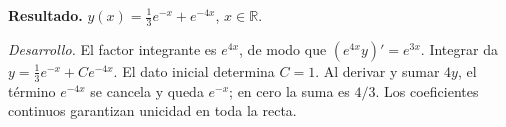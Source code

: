 \noindent\textbf{Resultado.} $y(x)=\tfrac13e^{-x}+e^{-4x}$, $x\in\mathbb R$.

\noindent\textit{Desarrollo.} El factor integrante es $e^{4x}$, de modo que $(e^{4x}y)'=e^{3x}$. Integrar da $y=\frac13e^{-x}+Ce^{-4x}$. El dato inicial determina $C=1$. Al derivar y sumar $4y$, el término $e^{-4x}$ se cancela y queda $e^{-x}$; en cero la suma es $4/3$. Los coeficientes continuos garantizan unicidad en toda la recta.
